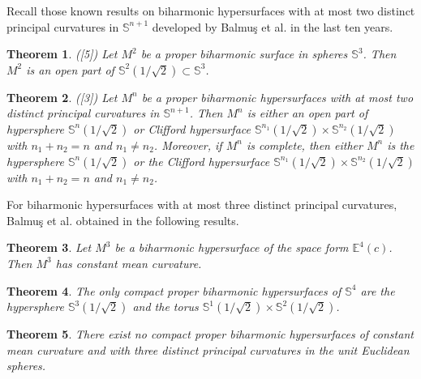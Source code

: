 \documentclass[twoside,reqno,A4]{amsart}
\newtheorem{theorem}{Theorem}[section]
\theoremstyle{definition}
\theoremstyle{remark}
\numberwithin{equation}{section}
\begin{document}
Recall those known results on biharmonic hypersurfaces with at most
two distinct principal curvatures in $\mathbb S^{n+1}$ developed by
Balmu\c{s} et al. in the last ten years.
\begin{theorem} {\rm([5])}
Let $M^2$ be a proper biharmonic surface in spheres $\mathbb S^3$.
Then $M^2$ is an open part of $\mathbb S^2(1/\sqrt2)\subset\mathbb
S^3$.
\end{theorem}
\begin{theorem} {\rm([3])}
Let $M^n$ be a proper biharmonic hypersurfaces with at most two
distinct principal curvatures in $\mathbb S^{n+1}$. Then $M^n$ is
either an open part of hypersphere $\mathbb S^n(1/\sqrt2)$ or
Clifford hypersurface $\mathbb S^{n_1}(1/\sqrt2)\times\mathbb
S^{n_2}(1/\sqrt2)$ with $n_1+n_2=n$ and $n_1\neq n_2$. Moreover, if
$M^n$ is complete, then either $M^n$ is the hypersphere $\mathbb
S^n(1/\sqrt2)$ or the Clifford hypersurface $\mathbb
S^{n_1}(1/\sqrt2)\times\mathbb S^{n_2}(1/\sqrt2)$ with $n_1+n_2=n$
and $n_1\neq n_2$.
\end{theorem}
For biharmonic hypersurfaces with at most three distinct principal
curvatures, Balmu\c{s} et al. obtained in \cite{BMO20102} the
following results.
\begin{theorem}
Let $M^3$ be a biharmonic hypersurface of the space form $\mathbb
E^4(c)$. Then $M^3$ has constant mean curvature.
\end{theorem}
\begin{theorem}
The only compact proper biharmonic hypersurfaces of $\mathbb S^4$
are the hypersphere $\mathbb S^3(1/\sqrt2)$ and the torus $\mathbb
S^1(1/\sqrt2)\times\mathbb S^2(1/\sqrt2)$.
\end{theorem}
\begin{theorem}
There exist no compact proper biharmonic hypersurfaces of constant
mean curvature and with three distinct principal curvatures in the
unit Euclidean spheres.
\end{theorem}
\end{document}
